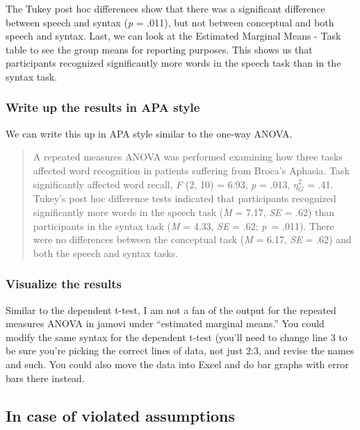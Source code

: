 \documentclass[
]{book}
\begin{document}
The Tukey post hoc differences show that there was a significant difference between speech and syntax (\emph{p} = .011), but not between conceptual and both speech and syntax. Last, we can look at the Estimated Marginal Means - Task table to see the group means for reporting purposes. This shows us that participants recognized significantly more words in the speech task than in the syntax task.

\hypertarget{write-up-the-results-in-apa-style-7}{%
\subsubsection{Write up the results in APA style}\label{write-up-the-results-in-apa-style-7}}

We can write this up in APA style similar to the one-way ANOVA.

\begin{quote}
A repeated measures ANOVA was performed examining how three tasks affected word recognition in patients suffering from Broca's Aphasia. Task significantly affected word recall, \emph{F} (2, 10) = 6.93, \emph{p} = .013, \(\eta^2_G\) = .41. Tukey's post hoc difference tests indicated that participants recognized significantly more words in the speech task (\emph{M} = 7.17, \emph{SE} = .62) than participants in the syntax task (\emph{M} = 4.33, \emph{SE} = .62; \emph{p}~= .011). There were no differences between the conceptual task (\emph{M} = 6.17, \emph{SE} = .62) and both the speech and syntax tasks.
\end{quote}

\hypertarget{visualize-the-results-6}{%
\subsubsection{Visualize the results}\label{visualize-the-results-6}}

Similar to the dependent t-test, I am not a fan of the output for the repeated measures ANOVA in jamovi under ``estimated marginal means.'' You could modify the same syntax for the dependent t-test (you'll need to change line 3 to be sure you're picking the correct lines of data, not just 2:3, and revise the names and such. You could also move the data into Excel and do bar graphs with error bars there instead.

\hypertarget{in-case-of-violated-assumptions-6}{%
\subsection{In case of violated assumptions}\label{in-case-of-violated-assumptions-6}}
\end{document}
